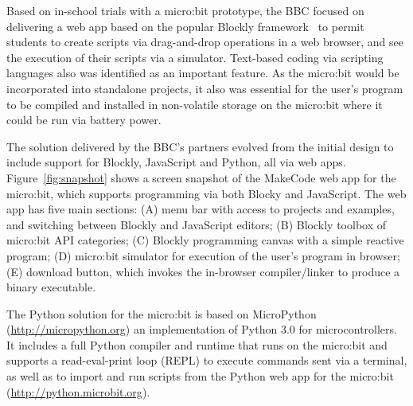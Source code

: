 Based on in-school trials with a micro:bit prototype, the BBC focused on delivering a web app 
based on the popular Blockly framework~\cite{Blocky2015} to permit students to
create scripts via drag-and-drop operations in a web browser, and see
the execution of their scripts via a simulator.
Text-based coding via scripting languages also 
was identified as an important feature. As the micro:bit would be incorporated 
into standalone projects, it also was essential for the user's program to be 
compiled and installed in non-volatile storage on the micro:bit where it 
could be run via battery power.



The solution delivered by the BBC's partners evolved from the initial
design to include support for Blockly, JavaScript and Python, all 
via web apps. 
Figure~\ref{fig:snapshot} shows a screen snapshot of the MakeCode web app
for the micro:bit, 
which supports programming via both Blocky and JavaScript.
The web app has five main sections: (A) menu bar with access to projects
and examples, and switching between Blockly and JavaScript editors; (B)
Blockly toolbox of micro:bit API categories; (C) Blockly programming
canvas with a simple reactive program; (D) micro:bit simulator for execution
of the user's program in browser; (E) download button, which invokes the in-browser
compiler/linker to produce a binary executable. 


The Python solution for the micro:bit is based on MicroPython (\url{http://micropython.org})
an implementation of Python 3.0 for microcontrollers. It includes 
a full Python compiler and runtime that runs on the micro:bit and
supports a read-eval-print loop (REPL) to execute commands sent via 
a terminal, as well as to import and run scripts from the Python web app for 
the micro:bit (\url{http://python.microbit.org}).

